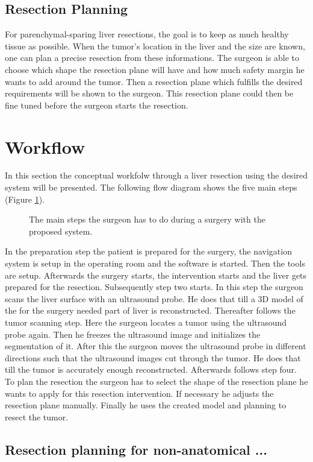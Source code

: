 \subsection{Resection Planning}
For parenchymal-sparing liver resections, the goal is to keep as much healthy tissue as
possible. When the tumor's location in the liver and the size are known, one can plan a
precise resection from these informations. The surgeon is able to choose
which shape the resection plane will have and how much safety margin he wants to
add around the tumor. Then a resection plane which fulfills the desired requirements
will be shown to the surgeon. This resection plane could then be fine tuned before the
surgeon starts the resection.

\section{Workflow}
In this section the conceptual workfolw through a liver resection using the
desired system will be presented. The following flow diagram shows the five main
steps (Figure \ref{fig:conceptWorkflow}).
\begin{figure}[H]
  \centering
  \caption{The main steps the surgeon has to do during a surgery with the
    proposed system.}
  \label{fig:conceptWorkflow}
\end{figure}
In the preparation step the patient is prepared for the surgery, the
navigation system is setup in the operating room and the software is started.
Then the tools are setup. Afterwards the surgery starts, the intervention starts and the liver gets
prepared for the resection. Subsequently step two starts. In this step the
surgeon scans the liver surface with an ultrasound probe. He does that till a 3D
model of the for the surgery needed part of liver is reconstructed. Thereafter
follows the tumor scanning step. Here the surgeon locates a tumor using the
ultrasound probe again. Then he freezes the ultrasound image and initializes the
segmentation of it. After this the surgeon moves the ultrasound probe in
different directions such that the ultrasound images cut through the tumor. He
does that till the tumor is accurately enough reconstructed. Afterwards follows
step four. To plan the resection the surgeon has to select the shape of the
resection plane he wants to apply for this resection intervention. If necessary
he adjusts the resection plane manually. Finally he uses the created model and
planning to resect the tumor. 
\subsection{Resection planning for non-anatomical ...}

